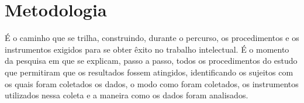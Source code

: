 \chapter{Metodologia}
    
    É o caminho que se trilha, construindo, durante o percurso, os procedimentos e os instrumentos exigidos para se obter êxito no trabalho intelectual. É o momento da pesquisa em que se explicam, passo a passo, todos os procedimentos do estudo que permitiram que os resultados fossem atingidos, identificando os sujeitos com os quais foram coletados os dados, o modo como foram coletados, os instrumentos utilizados nessa coleta e a maneira como os dados foram analisados. 

    